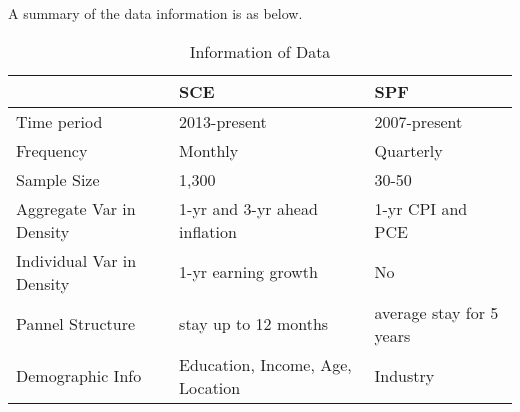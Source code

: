 \documentclass[]{article}
\begin{document}
A summary of the data information is as below. 

\begin{table}[]
			\caption{Information of Data}
	\begin{tabular}{lll}

		\hline 
		& SCE & SPF        \\
		\hline 
		Time period                                    & 2013-present                            & 2007-present             \\
		Frequency                                      & Monthly                                 & Quarterly                \\
		Sample Size                                    & 1,300                                   & 30-50                    \\
		Aggregate Var in Density                       & 1-yr  and 3-yr ahead inflation          & 1-yr CPI and PCE         \\
		Individual Var in Density                      & 1-yr earning growth                     & No                       \\
		Pannel Structure                               & stay up to 12 months                    & average stay for 5 years \\
		Demographic Info                        & Education, Income, Age, Location        & Industry    \\
		\hline 
	\end{tabular}
\end{table}



\end{document}
